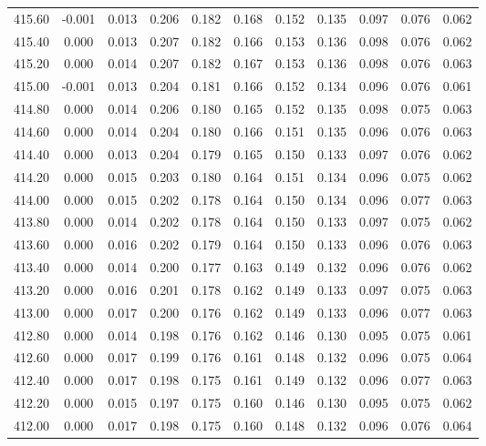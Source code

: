 \begin{longtable}{cccccccccc}
    415.60 & -0.001 &  0.013 &  0.206 &  0.182 &  0.168 &  0.152 &  0.135 &  0.097 &  0.076 &  0.062 \\
    415.40 &  0.000 &  0.013 &  0.207 &  0.182 &  0.166 &  0.153 &  0.136 &  0.098 &  0.076 &  0.062 \\
    415.20 &  0.000 &  0.014 &  0.207 &  0.182 &  0.167 &  0.153 &  0.136 &  0.098 &  0.076 &  0.063 \\
    415.00 & -0.001 &  0.013 &  0.204 &  0.181 &  0.166 &  0.152 &  0.134 &  0.096 &  0.076 &  0.061 \\
    414.80 &  0.000 &  0.014 &  0.206 &  0.180 &  0.165 &  0.152 &  0.135 &  0.098 &  0.075 &  0.063 \\
    414.60 &  0.000 &  0.014 &  0.204 &  0.180 &  0.166 &  0.151 &  0.135 &  0.096 &  0.076 &  0.063 \\
    414.40 &  0.000 &  0.013 &  0.204 &  0.179 &  0.165 &  0.150 &  0.133 &  0.097 &  0.076 &  0.062 \\
    414.20 &  0.000 &  0.015 &  0.203 &  0.180 &  0.164 &  0.151 &  0.134 &  0.096 &  0.075 &  0.062 \\
    414.00 &  0.000 &  0.015 &  0.202 &  0.178 &  0.164 &  0.150 &  0.134 &  0.096 &  0.077 &  0.063 \\
    413.80 &  0.000 &  0.014 &  0.202 &  0.178 &  0.164 &  0.150 &  0.133 &  0.097 &  0.075 &  0.062 \\
    413.60 &  0.000 &  0.016 &  0.202 &  0.179 &  0.164 &  0.150 &  0.133 &  0.096 &  0.076 &  0.063 \\
    413.40 &  0.000 &  0.014 &  0.200 &  0.177 &  0.163 &  0.149 &  0.132 &  0.096 &  0.076 &  0.062 \\
    413.20 &  0.000 &  0.016 &  0.201 &  0.178 &  0.162 &  0.149 &  0.133 &  0.097 &  0.075 &  0.063 \\
    413.00 &  0.000 &  0.017 &  0.200 &  0.176 &  0.162 &  0.149 &  0.133 &  0.096 &  0.077 &  0.063 \\
    412.80 &  0.000 &  0.014 &  0.198 &  0.176 &  0.162 &  0.146 &  0.130 &  0.095 &  0.075 &  0.061 \\
    412.60 &  0.000 &  0.017 &  0.199 &  0.176 &  0.161 &  0.148 &  0.132 &  0.096 &  0.075 &  0.064 \\
    412.40 &  0.000 &  0.017 &  0.198 &  0.175 &  0.161 &  0.149 &  0.132 &  0.096 &  0.077 &  0.063 \\
    412.20 &  0.000 &  0.015 &  0.197 &  0.175 &  0.160 &  0.146 &  0.130 &  0.095 &  0.075 &  0.062 \\
    412.00 &  0.000 &  0.017 &  0.198 &  0.175 &  0.160 &  0.148 &  0.132 &  0.096 &  0.076 &  0.064 \\

\end{longtable}
